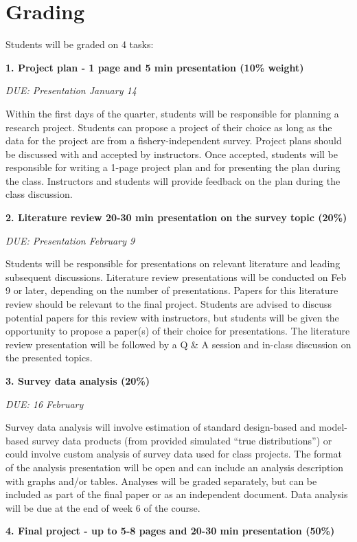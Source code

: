 \documentclass[
  letterpaper,
  oneside,
  open=any]{scrbook}
\begin{document}
\section{Grading}\label{grading}

Students will be graded on 4 tasks:

\textbf{1. Project plan - 1 page and 5 min presentation (10\% weight)}

\emph{DUE: Presentation January 14}

Within the first days of the quarter, students will be responsible for
planning a research project. Students can propose a project of their
choice as long as the data for the project are from a
fishery-independent survey. Project plans should be discussed with and
accepted by instructors. Once accepted, students will be responsible for
writing a 1-page project plan and for presenting the plan during the
class. Instructors and students will provide feedback on the plan during
the class discussion.

\textbf{2. Literature review 20-30 min presentation on the survey topic
(20\%)}

\emph{DUE: Presentation February 9}

Students will be responsible for presentations on relevant literature
and leading subsequent discussions. Literature review presentations will
be conducted on Feb 9 or later, depending on the number of
presentations. Papers for this literature review should be relevant to
the final project. Students are advised to discuss potential papers for
this review with instructors, but students will be given the opportunity
to propose a paper(s) of their choice for presentations. The literature
review presentation will be followed by a Q \& A session and in-class
discussion on the presented topics.

\textbf{3. Survey data analysis (20\%)}

\emph{DUE: 16 February}

Survey data analysis will involve estimation of standard design-based
and model-based survey data products (from provided simulated ``true
distributions'') or could involve custom analysis of survey data used
for class projects. The format of the analysis presentation will be open
and can include an analysis description with graphs and/or tables.
Analyses will be graded separately, but can be included as part of the
final paper or as an independent document. Data analysis will be due at
the end of week 6 of the course.

\textbf{4. Final project - up to 5-8 pages and 20-30 min presentation
(50\%)}
\end{document}
